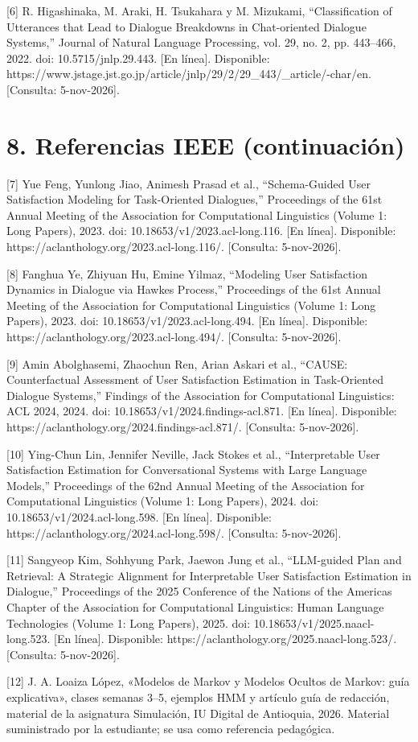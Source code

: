 \documentclass[10pt,a4paper]{article}
\begin{document}
[6] R. Higashinaka, M. Araki, H. Tsukahara y M. Mizukami, “Classification of Utterances that Lead to Dialogue Breakdowns in Chat-oriented Dialogue Systems,” Journal of Natural Language Processing, vol. 29, no. 2, pp. 443–466, 2022. doi: 10.5715/jnlp.29.443. [En línea]. Disponible: https://www.jstage.jst.go.jp/article/jnlp/29/2/29\_443/\_article/-char/en. [Consulta: 5-nov-2026].


\clearpage
\section*{8. Referencias IEEE (continuación)}
[7] Yue Feng, Yunlong Jiao, Animesh Prasad et al., “Schema-Guided User Satisfaction Modeling for Task-Oriented Dialogues,” Proceedings of the 61st Annual Meeting of the Association for Computational Linguistics (Volume 1: Long Papers), 2023. doi: 10.18653/v1/2023.acl-long.116. [En línea]. Disponible: https://aclanthology.org/2023.acl-long.116/. [Consulta: 5-nov-2026].


[8] Fanghua Ye, Zhiyuan Hu, Emine Yilmaz, “Modeling User Satisfaction Dynamics in Dialogue via Hawkes Process,” Proceedings of the 61st Annual Meeting of the Association for Computational Linguistics (Volume 1: Long Papers), 2023. doi: 10.18653/v1/2023.acl-long.494. [En línea]. Disponible: https://aclanthology.org/2023.acl-long.494/. [Consulta: 5-nov-2026].


[9] Amin Abolghasemi, Zhaochun Ren, Arian Askari et al., “CAUSE: Counterfactual Assessment of User Satisfaction Estimation in Task-Oriented Dialogue Systems,” Findings of the Association for Computational Linguistics: ACL 2024, 2024. doi: 10.18653/v1/2024.findings-acl.871. [En línea]. Disponible: https://aclanthology.org/2024.findings-acl.871/. [Consulta: 5-nov-2026].


[10] Ying-Chun Lin, Jennifer Neville, Jack Stokes et al., “Interpretable User Satisfaction Estimation for Conversational Systems with Large Language Models,” Proceedings of the 62nd Annual Meeting of the Association for Computational Linguistics (Volume 1: Long Papers), 2024. doi: 10.18653/v1/2024.acl-long.598. [En línea]. Disponible: https://aclanthology.org/2024.acl-long.598/. [Consulta: 5-nov-2026].


[11] Sangyeop Kim, Sohhyung Park, Jaewon Jung et al., “LLM-guided Plan and Retrieval: A Strategic Alignment for Interpretable User Satisfaction Estimation in Dialogue,” Proceedings of the 2025 Conference of the Nations of the Americas Chapter of the Association for Computational Linguistics: Human Language Technologies (Volume 1: Long Papers), 2025. doi: 10.18653/v1/2025.naacl-long.523. [En línea]. Disponible: https://aclanthology.org/2025.naacl-long.523/. [Consulta: 5-nov-2026].


[12] J. A. Loaiza López, «Modelos de Markov y Modelos Ocultos de Markov: guía explicativa», clases semanas 3–5, ejemplos HMM y artículo guía de redacción, material de la asignatura Simulación, IU Digital de Antioquia, 2026. Material suministrado por la estudiante; se usa como referencia pedagógica.


\clearpage
\end{document}
